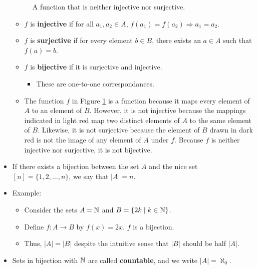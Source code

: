 \documentclass[../apprentice.tex]{subfiles}
\begin{document}
\begin{itemize}
\begin{figure}[h!]
        \caption{A function that is neither injective nor surjective.}
        \label{fig:notInjectSurject}
    \end{figure}
    \begin{itemize}
        \item $f$ is \textbf{injective} if for all $a_1,a_2\in A$, $f(a_1)=f(a_2) \Longrightarrow a_1=a_2$.
        \item $f$ is \textbf{surjective} if for every element $b\in B$, there exists an $a\in A$ such that $f(a)=b$.
        \item $f$ is \textbf{bijective} if it is surjective and injective.
        \begin{itemize}
            \item These are one-to-one correspondances.
        \end{itemize}
        \item The function $f$ in Figure \ref{fig:notInjectSurject} is a function because it maps every element of $A$ to an element of $B$. However, it is not injective because the mappings indicated in \textcolor{rey}{light red} map two distinct elements of $A$ to the same element of $B$. Likewise, it is not surjective because the element of $B$ drawn in \textcolor{rex}{dark red} is not the image of any element of $A$ under $f$. Because $f$ is neither injective nor surjective, it is not bijective.
    \end{itemize}
    \item If there exists a bijection between the set $A$ and the nice set $[n]=\{1,2,\dots,n\}$, we say that $|A|=n$.
    \item Example:
    \begin{itemize}
        \item Consider the sets $A=\mathbb{N}$ and $B=\{2k\mid k\in\mathbb{N}\}$.
        \item Define $f:A\to B$ by $f(x)=2x$. $f$ is a bijection.
        \item Thus, $|A|=|B|$ despite the intuitive sense that $|B|$ should be half $|A|$.
    \end{itemize}
    \item Sets in bijection with $\mathbb{N}$ are called \textbf{countable}, and we write $|A|=\aleph_0$.

\end{itemize}
\end{document}
